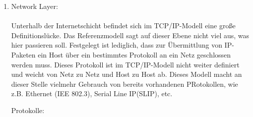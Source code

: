 \documentclass[11pt]{article}
\begin{document}
\begin{enumerate}
\begin{addmargin}[1em]{1em}
\begin{enumerate}
                \item IGRP (Interior Gateway Routin Protocol) - Informationsaustausch zwischen Routern (Distanzvektor)
                (veraltet - ersetzt durch EIGRP)\\

                \item OSPF (Open Shortes Path First) - Informationsaustausch zwischen Routern (Linkzustand) via IP\\

                \item BGP (Border Gateway Protocol) - Informationsaustausch zwischen autonomen Systemen im Internet via TCP\\

                \item RIP (Routing Information Protocol) - Informationsaustausch zwischen Routern vid UDP\\

                \item IGMP (Internet Group Management) - Organisation von Multicast-Gruppen, Bestandteil von IP auf allen Hosts,
                die den Empfang von IP-Multicast unterstützen\\

            \end{enumerate}
        \end{addmargin}

        \item Network Layer:\\\\
        Unterhalb der Internetschicht befindet sich im TCP/IP-Modell eine große Definitionslücke.
        Das Referenzmodell sagt auf dieser Ebene nicht viel aus, was hier passieren soll. Festgelegt ist
        lediglich, dass zur Übermittlung von IP-Paketen ein Host über ein bestimmtes Protokoll an ein Netz
        geschlossen werden muss. Dieses Protokoll ist im TCP/IP-Modell nicht weiter definiert und weicht
        von Netz zu Netz und Host zu Host ab. Dieses Modell macht an dieser Stelle vielmehr Gebrauch von
        bereits vorhandenen PRotokollen, wie z.B. Ethernet (IEE 802.3), Serial Line IP(SLIP), etc.\\


        \begin{addmargin}[1em]{1em}
            Protokolle:\\

            \begin{enumerate}


\end{enumerate}
\end{addmargin}
\end{enumerate}
\end{document}
